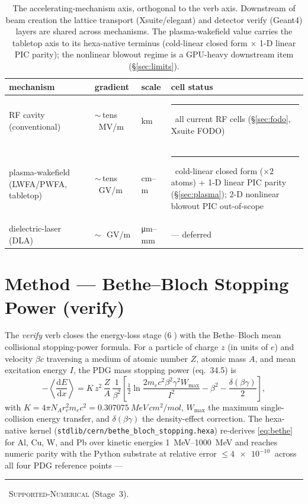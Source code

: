 \documentclass[11pt,a4paper]{article}
\newcommand{\tierdisc}[1]{\textcolor{#1}{\rule[0.05ex]{1.0ex}{1.0ex}}}
\newcommand{\tierGreen}{\tierdisc{green!60!black}}
\begin{document}
\begin{table}[h]
\centering
\small
\setlength{\tabcolsep}{4pt}
\begin{tabular}{@{}>{\raggedright\arraybackslash}m{3.0cm}>{\raggedright\arraybackslash}m{1.7cm}>{\raggedright\arraybackslash}m{1.5cm}>{\raggedright\arraybackslash}m{5.2cm}@{}}
\toprule
mechanism & gradient & scale & cell status \\
\midrule
RF cavity (conventional) & $\sim$\,tens \SI{}{MV/m} & km & \tierGreen\ all current RF cells (\S\ref{sec:fodo}, Xsuite FODO) \\
plasma-wakefield (LWFA/PWFA, tabletop) & $\sim$\,tens \SI{}{GV/m} & cm--m & \tierGreen\ cold-linear closed form ($\times 2$ atoms) + 1-D linear PIC parity (\S\ref{sec:plasma}); 2-D nonlinear blowout PIC out-of-scope \\
dielectric-laser (DLA) & $\sim$\,\SI{}{GV/m} & \si{\micro\meter}--mm & --- deferred \\
\bottomrule
\end{tabular}
\caption{The accelerating-mechanism axis, orthogonal to the verb axis.
Downstream of beam creation the lattice transport (Xsuite/elegant) and
detector verify (Geant4) layers are shared across mechanisms. The
plasma-wakefield value carries the tabletop axis to its hexa-native
terminus (cold-linear closed form $\times$ 1-D linear PIC parity); the
nonlinear blowout regime is a GPU-heavy downstream item
(\S\ref{sec:limits}).}
\label{tab:mech}
\end{table}

\section{Method --- Bethe--Bloch Stopping Power (verify)}
\label{sec:bethe}

The \emph{verify} verb closes the energy-loss stage
(\textcircled{\scriptsize 6}) with the Bethe--Bloch mean collisional
stopping-power formula. For a particle of charge $z$ (in units of $e$)
and velocity $\beta c$ traversing a medium of atomic number $Z$, atomic
mass $A$, and mean excitation energy $I$, the PDG mass stopping power
(eq.~34.5) is \citep{pdg2024}
\begin{equation}
-\left\langle\frac{\mathrm{d}E}{\mathrm{d}x}\right\rangle
  = K\,z^{2}\,\frac{Z}{A}\,\frac{1}{\beta^{2}}
   \left[\tfrac12\ln\!\frac{2 m_e c^{2}\beta^{2}\gamma^{2} W_{\max}}{I^{2}}
   - \beta^{2} - \frac{\delta(\beta\gamma)}{2}\right],
\label{eq:bethe}
\end{equation}
with $K = 4\pi N_A r_e^{2} m_e c^{2} = \SI{0.307075}{MeV\,cm^2/mol}$,
$W_{\max}$ the maximum single-collision energy transfer, and
$\delta(\beta\gamma)$ the density-effect correction. The hexa-native
kernel (\verb|stdlib/cern/bethe_bloch_stopping.hexa|) re-derives
\eqref{eq:bethe} for Al, Cu, W, and Pb over kinetic energies
\SIrange{1}{1000}{MeV} and reaches numeric parity with the Python
substrate at relative error $\le\SI{4e-10}{}$ across all four PDG
reference points --- \tierGreen\ \textsc{Supported-Numerical} (Stage~3).
\end{document}
